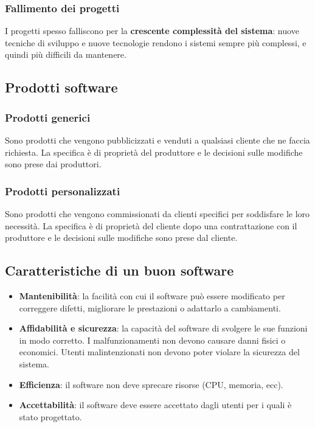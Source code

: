 \documentclass[a4paper]{article}
\begin{document}
\subsubsection{Fallimento dei progetti}
I progetti spesso falliscono per la \textbf{crescente complessità del sistema}: nuove 
tecniche di sviluppo e nuove tecnologie rendono i sistemi sempre più complessi, e quindi 
più difficili da mantenere.

\subsection{Prodotti software}
\subsubsection{Prodotti generici}
Sono prodotti che vengono pubblicizzati e venduti a qualsiasi cliente che ne faccia 
richiesta. La specifica è di proprietà del produttore e le decisioni sulle modifiche
sono prese dai produttori.

\subsubsection{Prodotti personalizzati}
Sono prodotti che vengono commissionati da clienti specifici per soddisfare le loro
necessità. La specifica è di proprietà del cliente dopo una contrattazione con il
produttore e le decisioni sulle modifiche sono prese dal cliente.

\subsection{Caratteristiche di un buon software}
\begin{itemize}
  \item \textbf{Mantenibilità}: la facilità con cui il software può essere modificato
  per correggere difetti, migliorare le prestazioni o adattarlo a cambiamenti.

  \item \textbf{Affidabilità e sicurezza}: la capacità del software di svolgere le sue
  funzioni in modo corretto. I malfunzionamenti non devono causare danni fisici o economici.
  Utenti malintenzionati non devono poter violare la sicurezza del sistema.
  
  \item \textbf{Efficienza}: il software non deve sprecare risorse (CPU, memoria, ecc).

  \item \textbf{Accettabilità}: il software deve essere accettato dagli utenti per i quali
  è stato progettato.
\end{itemize}
\end{document}
